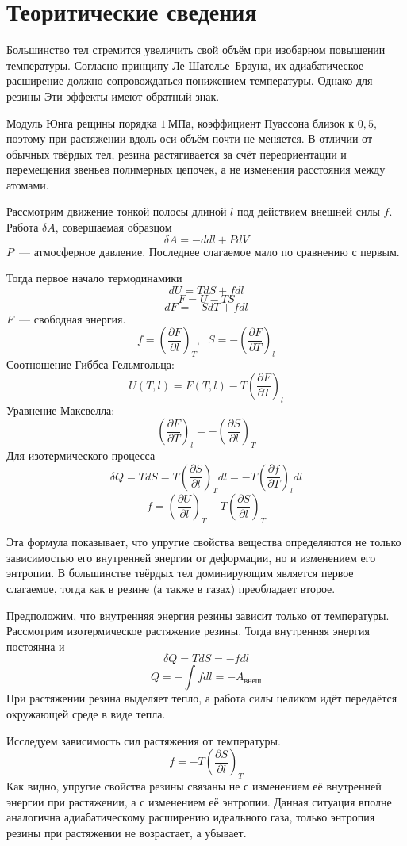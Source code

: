 \section{Теоритические сведения}
Большинство тел стремится увеличить свой объём при изобарном повышении температуры.
Согласно принципу Ле-Шателье–Брауна, их адиабатическое расширение должно сопровождаться
понижением температуры. Однако для резины Эти эффекты имеют обратный знак.

Модуль Юнга рещины порядка $1\,\text{МПа}$, коэффициент Пуассона близок к $0{,}5$,
поэтому при растяжении вдоль оси объём почти не меняется. В отличии от обычных
твёрдых тел, резина растягивается за счёт переориентации и перемещения звеньев
полимерных цепочек, а не изменения расстояния между атомами.

Рассмотрим движение тонкой полосы длиной $l$ под действием внешней силы $f$.
Работа $\delta A$, совершаемая образцом
\[\delta A = -ddl + PdV\]
$P$~--- атмосферное давление. Последнее слагаемое мало по сравнению с первым.

Тогда первое начало термодинамики
\[dU=TdS+fdl\]
\[F=U-TS\]
\[dF=-SdT+fdl\]
$F$~--- свободная энергия.
\[f=\left(\frac{\partial F}{\partial l}\right)_T,\;\;S=-\left(\frac{\partial F}{\partial T}\right)_l\]
Соотношение Гиббса-Гельмгольца:
\[U(T, l) = F(T, l) - T\left(\frac{\partial F}{\partial T}\right)_l\]
Уравнение Максвелла:
\[\left(\frac{\partial F}{\partial T}\right)_l=-\left(\frac{\partial S}{\partial l}\right)_T\]
Для изотермического процесса
\[\delta Q = TdS = T\left(\frac{\partial S}{\partial l}\right)_Tdl=-T\left(\frac{\partial f}{\partial T}\right)_ldl\]
\[f=\left(\frac{\partial U}{\partial l}\right)_T - T\left(\frac{\partial S}{\partial l}\right)_T\]

Эта формула показывает, что упругие свойства вещества определяются не
только зависимостью его внутренней энергии от деформации, но и изменением его энтропии.
В большинстве твёрдых тел доминирующим является первое слагаемое, тогда как в резине
(а также в газах) преобладает второе.

Предположим, что внутренняя энергия резины зависит только от температуры.
Рассмотрим изотермическое растяжение резины. Тогда внутренняя энергия постоянна и
\[\delta Q = TdS=-fdl\]
\[Q = -\int fdl = -A_\text{внеш}\]
При растяжении резина выделяет тепло, а работа силы целиком идёт передаётся
окружающей среде в виде тепла.

Исследуем зависимость сил растяжения от температуры.
\[f=-T\left(\frac{\partial S}{\partial l}\right)_T\]
Как видно, упругие свойства резины связаны не с изменением её внутренней
энергии при растяжении, а с изменением её энтропии. Данная ситуация вполне
аналогична адиабатическому расширению идеального газа, только энтропия
резины при растяжении не возрастает, а убывает.

